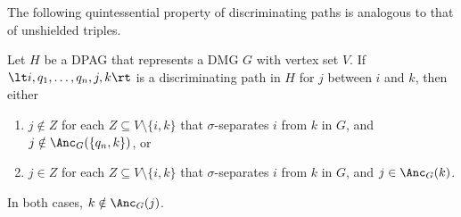 The following quintessential property of discriminating paths is analogous to that of unshielded triples. 
\begin{Prp}\label{prp:orienting_discriminating_paths}
  Let $H$ be a DPAG that represents a DMG $G$ with vertex set $V$.
  If $\lt i, q_1, \dots, q_n, j, k \rt$ is a discriminating path in $H$ for $j$ between $i$ and $k$, then
  either 
  \begin{enumerate}[label=(\roman*)]
    \item $j \notin Z$ for each $Z \subseteq V \setminus \{i,k\}$ that $\sigma$-separates $i$ from $k$ in $G$, and $j \notin \Anc_G(\{q_n,k\})$, or
    \item $j \in Z$ for each $Z \subseteq V \setminus \{i,k\}$ that $\sigma$-separates $i$ from $k$ in $G$, and $j \in \Anc_G(k)$.
  \end{enumerate}
  In both cases, $k \notin \Anc_G(j)$.
\end{Prp}
